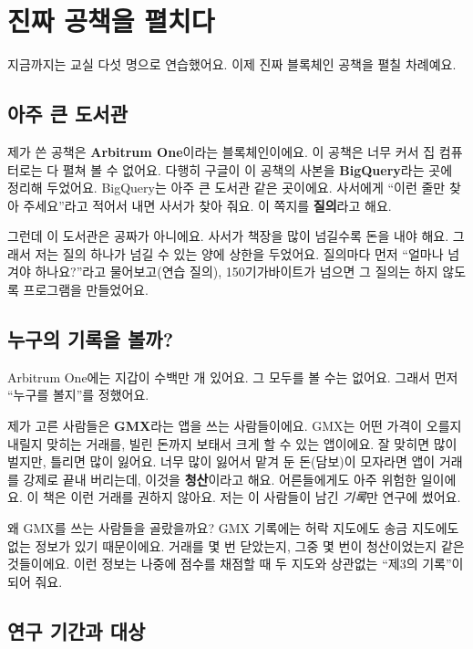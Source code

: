 \chapter{진짜 공책을 펼치다}

지금까지는 교실 다섯 명으로 연습했어요.
이제 진짜 블록체인 공책을 펼칠 차례예요.

\section{아주 큰 도서관}

제가 쓴 공책은 \textbf{Arbitrum One}이라는 블록체인이에요.
이 공책은 너무 커서 집 컴퓨터로는 다 펼쳐 볼 수 없어요.
다행히 구글이 이 공책의 사본을 \textbf{BigQuery}라는 곳에 정리해 두었어요.
BigQuery는 아주 큰 도서관 같은 곳이에요.
사서에게 “이런 줄만 찾아 주세요”라고 적어서 내면 사서가 찾아 줘요.
이 쪽지를 \textbf{질의}라고 해요.

그런데 이 도서관은 공짜가 아니에요.
사서가 책장을 많이 넘길수록 돈을 내야 해요.
그래서 저는 질의 하나가 넘길 수 있는 양에 상한을 두었어요.
질의마다 먼저 “얼마나 넘겨야 하나요?”라고 물어보고(연습 질의),
150기가바이트가 넘으면 그 질의는 하지 않도록 프로그램을 만들었어요.

\section{누구의 기록을 볼까?}

Arbitrum One에는 지갑이 수백만 개 있어요.
그 모두를 볼 수는 없어요.
그래서 먼저 “누구를 볼지”를 정했어요.

제가 고른 사람들은 \textbf{GMX}라는 앱을 쓰는 사람들이에요.
GMX는 어떤 가격이 오를지 내릴지 맞히는 거래를, 빌린 돈까지 보태서 크게 할 수 있는 앱이에요.
잘 맞히면 많이 벌지만, 틀리면 많이 잃어요.
너무 많이 잃어서 맡겨 둔 돈(담보)이 모자라면 앱이 거래를 강제로 끝내 버리는데, 이것을 \textbf{청산}이라고 해요.
어른들에게도 아주 위험한 일이에요.
이 책은 이런 거래를 권하지 않아요.
저는 이 사람들이 남긴 \emph{기록}만 연구에 썼어요.

왜 GMX를 쓰는 사람들을 골랐을까요?
GMX 기록에는 허락 지도에도 송금 지도에도 없는 정보가 있기 때문이에요.
거래를 몇 번 닫았는지, 그중 몇 번이 청산이었는지 같은 것들이에요.
이런 정보는 나중에 점수를 채점할 때 두 지도와 상관없는 “제3의 기록”이 되어 줘요.

\section{연구 기간과 대상}

